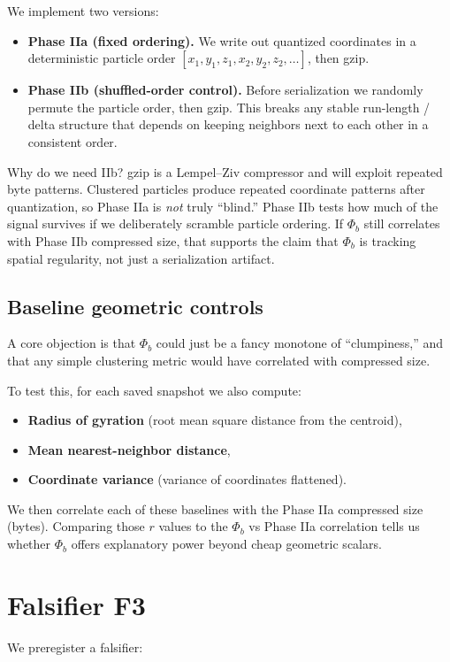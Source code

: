 \documentclass[11pt,a4paper]{article}
\numberwithin{equation}{section}
\newcommand{\phib}{\Phi_b}
\begin{document}
We implement two versions:

\begin{itemize}
\item \textbf{Phase IIa (fixed ordering).}  
We write out quantized coordinates in a deterministic particle order
$[x_1,y_1,z_1,x_2,y_2,z_2,\dots]$, then gzip.

\item \textbf{Phase IIb (shuffled-order control).}  
Before serialization we randomly permute the particle order, then gzip.  
This breaks any stable run-length / delta structure that depends on keeping neighbors next to each other in a consistent order.
\end{itemize}

Why do we need IIb? gzip is a Lempel--Ziv compressor and will exploit repeated byte patterns. Clustered particles produce repeated coordinate patterns after quantization, so Phase IIa is \emph{not} truly ``blind.'' Phase IIb tests how much of the signal survives if we deliberately scramble particle ordering. If $\phib$ still correlates with Phase IIb compressed size, that supports the claim that $\phib$ is tracking spatial regularity, not just a serialization artifact.

\subsection{Baseline geometric controls}
\label{sec:baselines}
A core objection is that $\phib$ could just be a fancy monotone of ``clumpiness,'' and that any simple clustering metric would have correlated with compressed size.

To test this, for each saved snapshot we also compute:
\begin{itemize}
\item \textbf{Radius of gyration} (root mean square distance from the centroid),
\item \textbf{Mean nearest-neighbor distance},
\item \textbf{Coordinate variance} (variance of coordinates flattened).
\end{itemize}

We then correlate each of these baselines with the Phase IIa compressed size (bytes). Comparing those $r$ values to the $\phib$ vs Phase IIa correlation tells us whether $\phib$ offers explanatory power beyond cheap geometric scalars.

\section{Falsifier F3}
We preregister a falsifier:
\end{document}
